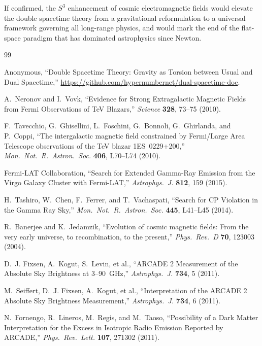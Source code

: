 \documentclass[a4paper]{article}
\begin{document}
If confirmed, the $S^3$ enhancement of cosmic electromagnetic fields would
elevate the double spacetime theory from a gravitational reformulation to a
universal framework governing all long-range physics, and would mark the end of
the flat-space paradigm that has dominated astrophysics since Newton.


\begin{thebibliography}{99}

Anonymous, ``Double Spacetime Theory: Gravity as Torsion between Usual and Dual
Spacetime,''
\url{https://github.com/hypernumbernet/dual-spacetime-doc}.

A.~Neronov and I.~Vovk,
``Evidence for Strong Extragalactic Magnetic Fields from Fermi Observations of
TeV Blazars,''
\textit{Science} \textbf{328}, 73--75 (2010).

F.~Tavecchio, G.~Ghisellini, L.~Foschini, G.~Bonnoli, G.~Ghirlanda, and
P.~Coppi,
``The intergalactic magnetic field constrained by Fermi/Large Area Telescope
observations of the TeV blazar 1ES~0229+200,''
\textit{Mon.\ Not.\ R.\ Astron.\ Soc.} \textbf{406}, L70--L74 (2010).

Fermi-LAT Collaboration,
``Search for Extended Gamma-Ray Emission from the Virgo Galaxy Cluster with
Fermi-LAT,''
\textit{Astrophys.\ J.} \textbf{812}, 159 (2015).

H.~Tashiro, W.~Chen, F.~Ferrer, and T.~Vachaspati,
``Search for CP Violation in the Gamma Ray Sky,''
\textit{Mon.\ Not.\ R.\ Astron.\ Soc.} \textbf{445}, L41--L45 (2014).

R.~Banerjee and K.~Jedamzik,
``Evolution of cosmic magnetic fields: From the very early universe, to
recombination, to the present,''
\textit{Phys.\ Rev.\ D} \textbf{70}, 123003 (2004).

D.~J. Fixsen, A.~Kogut, S.~Levin, et al.,
``ARCADE 2 Measurement of the Absolute Sky Brightness at 3--90~GHz,''
\textit{Astrophys.\ J.} \textbf{734}, 5 (2011).

M.~Seiffert, D.~J. Fixsen, A.~Kogut, et al.,
``Interpretation of the ARCADE 2 Absolute Sky Brightness Measurement,''
\textit{Astrophys.\ J.} \textbf{734}, 6 (2011).

N.~Fornengo, R.~Lineros, M.~Regis, and M.~Taoso,
``Possibility of a Dark Matter Interpretation for the Excess in Isotropic Radio
Emission Reported by ARCADE,''
\textit{Phys.\ Rev.\ Lett.} \textbf{107}, 271302 (2011).


\end{thebibliography}
\end{document}
